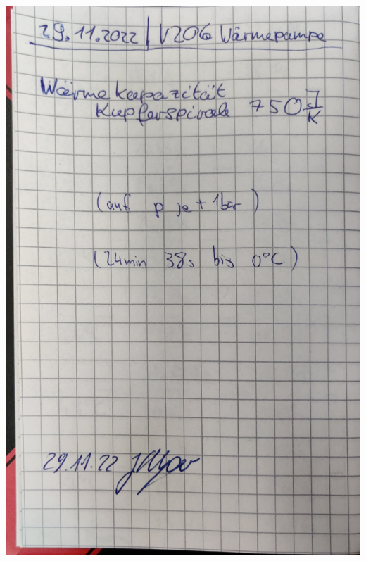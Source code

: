\begin{minipage}[t]{0.45\textwidth}
    \includegraphics[width=\textwidth, keepaspectratio, page=2]{v206 Messdaten.pdf}
\end{minipage}

